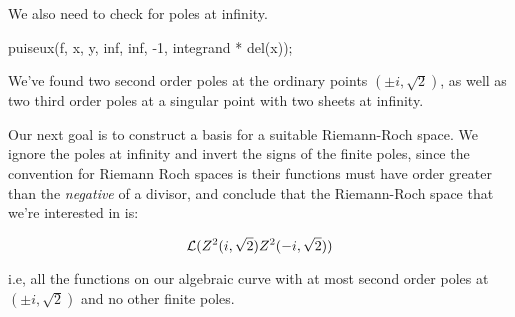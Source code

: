 We also need to check for poles at infinity.

\begin{maximablock}
puiseux(f, x, y, inf, inf, -1,
        integrand * del(x));
\end{maximablock}

We've found two second order poles at the ordinary points $(\pm i, \sqrt{2})$,
as well as two third order poles at a singular point with two sheets at infinity.

Our next goal is to construct a basis for a suitable Riemann-Roch space.
We ignore the poles at infinity and invert the signs of the finite poles,
since the convention for Riemann Roch spaces is their functions must
have order greater than the {\it negative} of a divisor, and conclude
that the Riemann-Roch space that we're interested in is:

$${\cal L}(Z^2(i, \sqrt{2}) Z^2(-i, \sqrt{2}))$$

i.e, all the functions on our algebraic curve with at most second order
poles at $(\pm i,\sqrt{2})$ and no other finite poles.



\endexample
